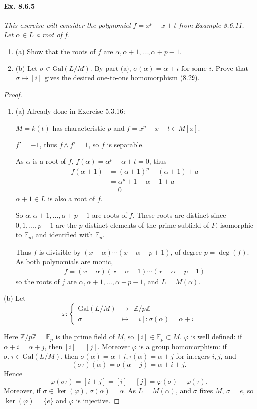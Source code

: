 \documentclass[11pt,a4paper]{article}
\newcommand{\be} {\begin{enumerate}}
\newcommand{\ee} {\end{enumerate}}
\newcommand{\Z}{\mathbb{Z}}
\newcommand{\F}{\mathbb{F}}
\newcommand{\Gal}{\mathrm{Gal}}
\begin{document}
\paragraph{Ex. 8.6.5}

{\it This exercise will consider the polynomial $f = x^p-x+t$ from Example 8.6.11. Let $\alpha \in L$ a root of $f$.
\be
\item[(a)] Show that the roots of $f$ are $\alpha,\alpha+1,\ldots,\alpha+p-1$.
\item[(b)] Let $\sigma \in \Gal(L/M)$. By part (a), $\sigma(\alpha) = \alpha+i$ for some $i$. Prove that $\sigma \mapsto [i]$ gives the desired one-to-one homomorphism (8.29).
\ee
}

\begin{proof}
\be
\item[(a)] Already done in Exercise 5.3.16: 

$M =k(t)$ has characteristic $p$ and  $f = x^p-x+t \in M[x]$.

$f' = -1$, thus $f\wedge f'=1$, so $f$ is separable.

As $\alpha$ is a root of $f$, $f(\alpha) = \alpha^p - \alpha+t =0$, thus
\begin{align*}
f(\alpha+1) &= (\alpha+1)^p - (\alpha+1) +a\\
&= \alpha^p+ 1 -\alpha - 1 +a\\
&=0
\end{align*}
$\alpha+1 \in L$ is also a root of $f$.

 So $\alpha, \alpha+1,\ldots,\alpha+p-1$ are roots of $f$. These roots are distinct since  $0,1,\ldots,p-1$ are the $p$ distinct elements of the prime subfield of  $F$, isomorphic to $\F_p$, and identified with $\F_p$.

 Thus $f$ is divisible by $(x-\alpha)\cdots(x-\alpha- p+1)$, of degree $p = \deg(f)$. As both polynomials are monic,
\begin{align}
f = (x-\alpha)(x-\alpha-1)\cdots(x-\alpha- p+1)
\end{align}
so the roots of $f$ are $\alpha,\alpha+1,\ldots,\alpha+p-1$, and $L = M(\alpha)$.
\ee

\item[(b)]
Let $$\varphi :
\left\{
\begin{array}{ccc}
  \Gal(L/M)& \to   & \Z/p\Z  \\
  \sigma&   \mapsto &  [i] : \sigma(\alpha) = \alpha +i 
\end{array}
\right.
$$

Here $\Z/p\Z = \F_p$ is the prime field of $M$, so $ [i] \in \F_p \subset M$. $\varphi$ is well defined: if $\alpha +i = \alpha +j$, then $[i] = [j]$. Moreover $\varphi$ is a group homomorphism: if $\sigma, \tau \in \Gal(L/M)$, then $\sigma(\alpha) = \alpha + i, \tau(\alpha) = \alpha +j$ for integers $i,j$, and
$$(\sigma \tau)(\alpha) = \sigma(\alpha +j) = \alpha + i + j .$$
Hence
$$\varphi(\sigma \tau) =[ i+j] = [i]+ [j] = \varphi(\sigma) + \varphi(\tau).$$
Moreover, if $\sigma \in \ker(\varphi)$, $\sigma(\alpha) = \alpha$. As $L = M(\alpha)$, and $\sigma$ fixes $M$, $\sigma = e$, so $\ker(\varphi) = \{e\}$ and $\varphi$ is injective.
\end{proof}
\end{document}
